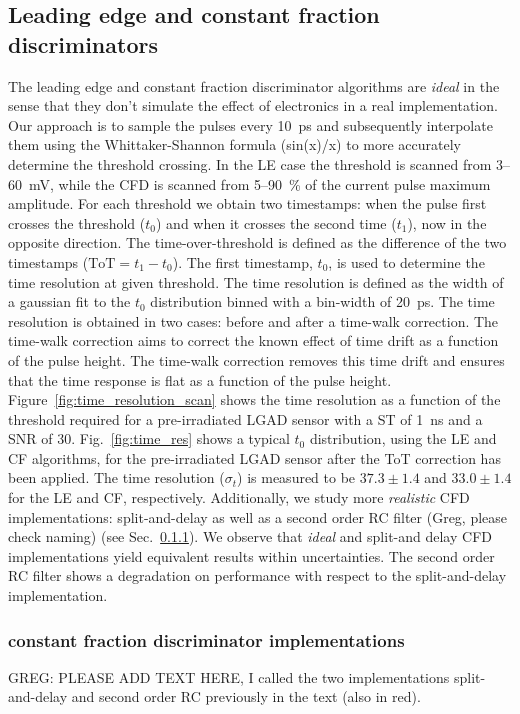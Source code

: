 \documentclass[preprint,1p]{elsarticle}
\begin{document}
\subsection{Leading edge and constant fraction discriminators}\label{sec:le_and_cfd}
The leading edge and constant fraction discriminator algorithms are \textit{ideal} in the sense that they don't simulate the effect of
electronics in a real implementation. Our approach is to sample the pulses every 10~\si{ps} and subsequently interpolate them
using the Whittaker-Shannon formula (sin(x)/x) to more accurately determine the threshold crossing. In the LE case the threshold is scanned
from 3--60~\si{mV}, while the CFD is scanned from 5--90~\% of the current pulse maximum amplitude. For each threshold we obtain two
timestamps: when the pulse first crosses the threshold ($t_{0}$) and when it crosses the second time ($t_{1}$), now in the opposite
direction. The time-over-threshold is defined as the difference of the two timestamps ($\mathrm{ToT} = t_{1} - t_{0}$). The first
timestamp, $t_{0}$, is used to determine the time resolution at given threshold. The time resolution is defined as the width of
a gaussian fit to the $t_{0}$ distribution binned with a bin-width of 20~\si{ps}. The time resolution is obtained in two cases:
before and after a time-walk correction. The time-walk correction aims to correct the known effect of time drift as a function
of the pulse height. The time-walk correction removes this time drift and ensures that the time response is flat as a function
of the pulse height. Figure~\ref{fig:time_resolution_scan} shows the time resolution as a function
of the threshold required for a pre-irradiated LGAD sensor with a ST of 1~\si{ns} and a SNR of 30.
Fig.~\ref{fig:time_res} shows a typical $t_{0}$ distribution, using the LE and CF algorithms, for the pre-irradiated
LGAD sensor after the ToT correction has been applied. The time resolution ($\sigma_{t}$) is measured to be $37.3 \pm 1.4 $
and $33.0 \pm 1.4$ for the LE and CF, respectively. Additionally, we study more \textit{realistic} CFD implementations:
{\color{red}split-and-delay as well as a second order RC filter (Greg, please check naming)} (see Sec.~\ref{sed:cfd_realistic}).
 We observe that \textit{ideal} and split-and delay CFD implementations yield equivalent results within uncertainties.
 The second order RC filter shows a degradation on performance with respect to the split-and-delay implementation.

\subsubsection{constant fraction discriminator implementations}\label{sed:cfd_realistic}
{\color{red}GREG: PLEASE ADD TEXT HERE, I called the two implementations split-and-delay and second order RC previously in the text (also in red)}.
\end{document}
